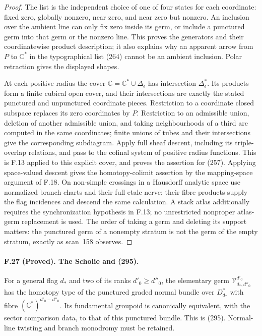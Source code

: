\begin{proof}
The list is the independent choice of one of four states for each
coordinate: fixed zero, globally nonzero, near zero, and near zero
but nonzero. An inclusion over the ambient line can only fix zero
inside its germ, or include a punctured germ into that germ or the
nonzero line. This proves the generators and their coordinatewise
product description; it also explains why an apparent arrow from
$P$ to $\mathbb C^*$ in the typographical list (264) cannot be an
ambient inclusion. Polar retraction gives the displayed shapes.

At each positive radius the cover
$\mathbb C=\mathbb C^*\cup\Delta_\epsilon$ has intersection
$\Delta_\epsilon^*$. Its products form a finite cubical open cover,
and their intersections are exactly the stated punctured and
unpunctured coordinate pieces. Restriction to a coordinate closed
subspace replaces its zero coordinates by $P$. Restriction to an
admissible union, deletion of another admissible union, and taking
neighbourhoods of a third are computed in the same coordinates;
finite unions of tubes and their intersections give the corresponding
subdiagram. Apply full sheaf descent, including its triple-overlap
relations, and pass to the cofinal system of positive radius
functions. This is F.13 applied to this explicit cover, and proves
the assertion for (257). Applying space-valued descent gives the
homotopy-colimit assertion by the mapping-space argument of F.18.
On non-simple crossings in a Hausdorff analytic space use normalized
branch charts and their full etale nerve; their fibre products supply
the flag incidences and descend the same calculation. A stack atlas
additionally requires the synchronization hypothesis in F.13; no
unrestricted nonproper atlas-germ replacement is used. The order of taking a germ and deleting
its support matters: the punctured germ of a nonempty stratum is
not the germ of the empty stratum, exactly as scan~158 observes.
\end{proof}

\paragraph{F.27 (Proved). The Scholie and (295).}
For a general flag $d_*$ and two of its ranks $d'_0\geq d''_0$,
the elementary germ $\mathcal V^{d'_0}_{d_*,d''_0}$ has the
homotopy type of the punctured graded normal bundle over
$D_{d_*}^*$ with fibre $(\mathbb C^*)^{d'_0-d''_0}$.
Its fundamental groupoid is canonically equivalent, with the sector
comparison data, to that of this punctured bundle. This is (295).
Normal-line twisting and branch monodromy must be retained.

